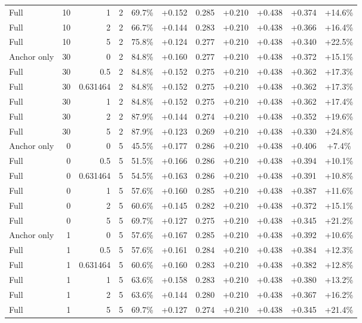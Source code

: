 \begin{table}[htbp]
\begin{tabular}{lrrrccccccc}
Full & 10 & 1 & 2 & 69.7\% & +0.152 & 0.285 & +0.210 & +0.438 & +0.374 & +14.6\% \\
Full & 10 & 2 & 2 & 66.7\% & +0.144 & 0.283 & +0.210 & +0.438 & +0.366 & +16.4\% \\
Full & 10 & 5 & 2 & 75.8\% & +0.124 & 0.277 & +0.210 & +0.438 & +0.340 & +22.5\% \\
Anchor only & 30 & 0 & 2 & 84.8\% & +0.160 & 0.277 & +0.210 & +0.438 & +0.372 & +15.1\% \\
Full & 30 & 0.5 & 2 & 84.8\% & +0.152 & 0.275 & +0.210 & +0.438 & +0.362 & +17.3\% \\
Full & 30 & 0.631464 & 2 & 84.8\% & +0.152 & 0.275 & +0.210 & +0.438 & +0.362 & +17.3\% \\
Full & 30 & 1 & 2 & 84.8\% & +0.152 & 0.275 & +0.210 & +0.438 & +0.362 & +17.4\% \\
Full & 30 & 2 & 2 & 87.9\% & +0.144 & 0.274 & +0.210 & +0.438 & +0.352 & +19.6\% \\
Full & 30 & 5 & 2 & 87.9\% & +0.123 & 0.269 & +0.210 & +0.438 & +0.330 & +24.8\% \\
Anchor only & 0 & 0 & 5 & 45.5\% & +0.177 & 0.286 & +0.210 & +0.438 & +0.406 & +7.4\% \\
Full & 0 & 0.5 & 5 & 51.5\% & +0.166 & 0.286 & +0.210 & +0.438 & +0.394 & +10.1\% \\
Full & 0 & 0.631464 & 5 & 54.5\% & +0.163 & 0.286 & +0.210 & +0.438 & +0.391 & +10.8\% \\
Full & 0 & 1 & 5 & 57.6\% & +0.160 & 0.285 & +0.210 & +0.438 & +0.387 & +11.6\% \\
Full & 0 & 2 & 5 & 60.6\% & +0.145 & 0.282 & +0.210 & +0.438 & +0.372 & +15.1\% \\
Full & 0 & 5 & 5 & 69.7\% & +0.127 & 0.275 & +0.210 & +0.438 & +0.345 & +21.2\% \\
Anchor only & 1 & 0 & 5 & 57.6\% & +0.167 & 0.285 & +0.210 & +0.438 & +0.392 & +10.6\% \\
Full & 1 & 0.5 & 5 & 57.6\% & +0.161 & 0.284 & +0.210 & +0.438 & +0.384 & +12.3\% \\
Full & 1 & 0.631464 & 5 & 60.6\% & +0.160 & 0.283 & +0.210 & +0.438 & +0.382 & +12.8\% \\
Full & 1 & 1 & 5 & 63.6\% & +0.158 & 0.283 & +0.210 & +0.438 & +0.380 & +13.2\% \\
Full & 1 & 2 & 5 & 63.6\% & +0.144 & 0.280 & +0.210 & +0.438 & +0.367 & +16.2\% \\
Full & 1 & 5 & 5 & 69.7\% & +0.127 & 0.274 & +0.210 & +0.438 & +0.345 & +21.4\% \\

\end{tabular}
\end{table}
